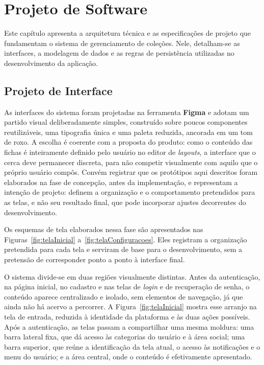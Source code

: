 \chapter{Projeto de Software}
\label{cap:06}

Este capítulo apresenta a arquitetura técnica e as especificações de projeto que fundamentam o sistema de gerenciamento de coleções. Nele, detalham-se as interfaces, a modelagem de dados e as regras de persistência utilizadas no desenvolvimento da aplicação.

\section{Projeto de Interface}
\label{sec:projetoInterface}
As interfaces do sistema foram projetadas na ferramenta \textbf{Figma} e adotam um partido visual deliberadamente simples, construído sobre poucos componentes reutilizáveis, uma tipografia única e uma paleta reduzida, ancorada em um tom de roxo. A escolha é coerente com a proposta do produto: como o conteúdo das fichas é inteiramente definido pelo usuário no editor de \textit{layouts}, a interface que o cerca deve permanecer discreta, para não competir visualmente com aquilo que o próprio usuário compôs. Convém registrar que os protótipos aqui descritos foram elaborados na fase de concepção, antes da implementação, e representam a intenção de projeto: definem a organização e o comportamento pretendidos para as telas, e não seu resultado final, que pode incorporar ajustes decorrentes do desenvolvimento.

Os esquemas de tela elaborados nessa fase são apresentados nas Figuras~\ref{fig:telaInicial} a~\ref{fig:telaConfiguracoes}. Eles registram a organização pretendida para cada tela e serviram de base para o desenvolvimento, sem a pretensão de corresponder ponto a ponto à interface final.

O sistema divide-se em duas regiões visualmente distintas. Antes da autenticação, na página inicial, no cadastro e nas telas de \textit{login} e de recuperação de senha, o conteúdo aparece centralizado e isolado, sem elementos de navegação, já que ainda não há acervo a percorrer. A Figura~\ref{fig:telaInicial} mostra esse arranjo na tela de entrada, reduzida à identidade da plataforma e às duas ações possíveis. Após a autenticação, as telas passam a compartilhar uma mesma moldura: uma barra lateral fixa, que dá acesso às categorias do usuário e à área social; uma barra superior, que reúne a identificação da tela atual, o acesso às notificações e o menu do usuário; e a área central, onde o conteúdo é efetivamente apresentado.

